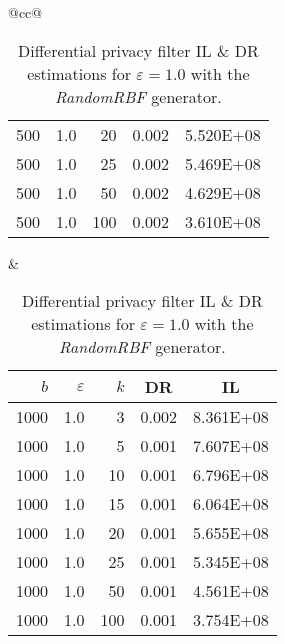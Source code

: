 \begin{table}[H]
\begin{tabular}{@{}cc@{}}
\begin{tabular}{@{}rrrrr@{}}
			500	&	1.0	&	20	&	0.002	&	5.520E+08 \\
			500	&	1.0	&	25	&	0.002	&	5.469E+08 \\
			500	&	1.0	&	50	&	0.002	&	4.629E+08 \\
			500	&	1.0	&	100	&	0.002	&	3.610E+08 \\
		\end{tabular}
		&
		\begin{tabular}{@{}rrrrr@{}}
			\toprule
			$b$ & $\varepsilon$ & $k$ & \multicolumn{1}{c}{DR} & \multicolumn{1}{c}{IL} \\ \midrule
			1000	&	1.0	&	3	&	0.002	&	8.361E+08 \\
			1000	&	1.0	&	5	&	0.001	&	7.607E+08 \\
			1000	&	1.0	&	10	&	0.001	&	6.796E+08 \\
			1000	&	1.0	&	15	&	0.001	&	6.064E+08 \\
			1000	&	1.0	&	20	&	0.001	&	5.655E+08 \\
			1000	&	1.0	&	25	&	0.001	&	5.345E+08 \\
			1000	&	1.0	&	50	&	0.001	&	4.561E+08 \\
			1000	&	1.0	&	100	&	0.001	&	3.754E+08 \\
		\end{tabular}
	\end{tabular}
	\caption[Differential privacy filter DR \& IL estimations (RandomRBF), $\varepsilon = 1.0$.]{Differential privacy filter IL \& DR estimations for $\varepsilon = 1.0$ with the \textit{RandomRBF} generator.}
	\label{table:results-wave-diff-priv-e1.0}
\end{table}

